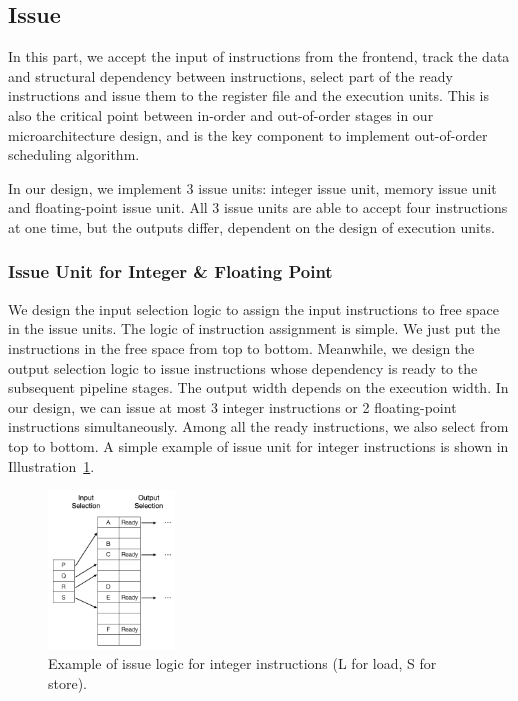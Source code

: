 \subsection{Issue} %
In this part, we accept the input of instructions from the frontend, track the data and structural dependency between instructions, select part of the ready instructions and issue them to the register file and the execution units. This is also the critical point between in-order and out-of-order stages in our microarchitecture design, and is the key component to implement out-of-order scheduling algorithm.

In our design, we implement 3 issue units: integer issue unit, memory issue unit and floating-point issue unit. All 3 issue units are able to accept four instructions at one time, but the outputs differ, dependent on the design of execution units.

\subsubsection{Issue Unit for Integer \& Floating Point} %
We design the input selection logic to assign the input instructions to free space in the issue units. The logic of instruction assignment is simple. We just put the instructions in the free space from top to bottom. Meanwhile, we design the output selection logic to issue instructions whose dependency is ready to the subsequent pipeline stages. The output width depends on the execution width. In our design, we can issue at most 3 integer instructions or 2 floating-point instructions simultaneously. Among all the ready instructions, we also select from top to bottom. A simple example of issue unit for integer instructions is shown in Illustration~\ref{fig:iq-int}.

\begin{figure}[!htp]
    \centering
    \includegraphics[width=0.3\textwidth]{figure/iq1.png}
    \caption{Example of issue logic for integer instructions (L for load, S for store).}
    \label{fig:iq-int}
\end{figure}

